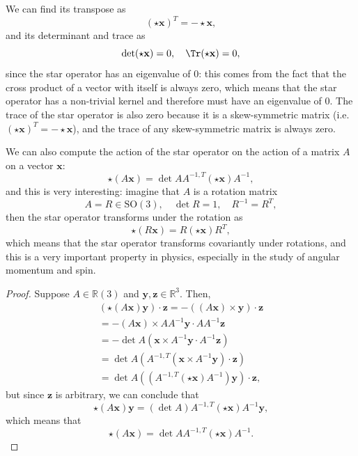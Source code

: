 We can find its transpose as
\[
    (\star \mathbf{x})^T = - \star \mathbf{x},
\]
and its determinant and trace as
\[
    \det(\star \mathbf{x}) = 0, \quad \Tr(\star \mathbf{x}) = 0,
\]
since the star operator has an eigenvalue of 0: this comes from the fact that the cross product of a vector with itself is always zero, which means that the star operator has a non-trivial kernel and therefore must have an eigenvalue of 0. The trace of the star operator is also zero because it is a skew-symmetric matrix (i.e. $(\star \mathbf{x})^T = -\star \mathbf{x}$), and the trace of any skew-symmetric matrix is always zero.

We can also compute the action of the star operator on the action of a matrix \(A\) on a vector \(\mathbf{x}\):
\[
    \star (A \mathbf{x}) = \det A A^{-1,T} (\star \mathbf{x}) A^{-1},
\]
and this is very interesting: imagine that \(A\) is a rotation matrix
\[
    A = R \in \mathrm{SO}(3), \quad \det R = 1, \quad R^{-1} = R^T,
\]
then the star operator transforms under the rotation as
\[
    \star (R \mathbf{x}) = R (\star \mathbf{x}) R^T,
\]
which means that the star operator transforms covariantly under rotations, and this is a very important property in physics, especially in the study of angular momentum and spin.

\begin{proof}
    Suppose \(A \in \mathbb{R}(3)\) and \(\mathbf{y}, \mathbf{z} \in \mathbb{R}^3\). Then,
    \[
        \begin{aligned}
            (\star (A \mathbf{x}) \mathbf{y}) \cdot \mathbf{z} = - ((A \mathbf{x}) \times \mathbf{y}) \cdot \mathbf{z} \\
            = - (A \mathbf{x}) \times A A^{-1} \mathbf{y} \cdot A A^{-1} \mathbf{z}                                    \\
            = - \det A (\mathbf{x} \times A^{-1} \mathbf{y} \cdot A^{-1} \mathbf{z})                                   \\
            = \det A (A^{-1,T} (\mathbf{x} \times A^{-1} \mathbf{y}) \cdot \mathbf{z})                                 \\
            = \det A ((A^{-1,T} (\star \mathbf{x}) A^{-1}) \mathbf{y}) \cdot \mathbf{z},
        \end{aligned}
    \]
    but since \(\mathbf{z}\) is arbitrary, we can conclude that
    \[
        \star (A \mathbf{x}) \mathbf{y} = (\det A) A^{-1,T} (\star \mathbf{x}) A^{-1}\mathbf{y},
    \]
    which means that
    \[
        \star (A \mathbf{x}) = \det A A^{-1,T} (\star \mathbf{x}) A^{-1}.
    \]
\end{proof}

